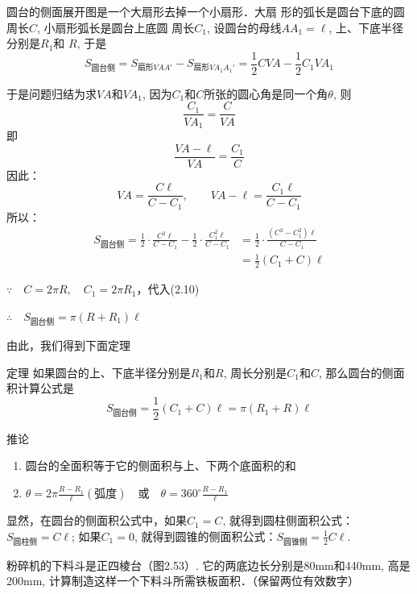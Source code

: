 圆台的侧面展开图是一个大扇形去掉一个小扇形．大扇
形的弧长是圆台下底的圆周长$C$, 小扇形弧长是圆台上底圆
周长$C_1$, 设圆台的母线$AA_1=\ell$, 上、下底半径分别是$R_1$和
$R$, 于是
\[S_{\text{圆台侧}}=S_{\text{扇形}VAA'}-S_{\text{扇形}VA_1A_1'}=\frac{1}{2}CVA-\frac{1}{2}C_1VA_1\]

于是问题归结为求$VA$和$VA_1$, 因为$C_1$和$C$所张的圆心角是同一个角$\theta$, 则
\[\frac{C_1}{VA_1}=\frac{C}{VA}\]
即
\[\frac{VA-\ell}{VA}=\frac{C_1}{C}\]
因此：
\begin{equation}
VA=\frac{C\ell}{C-C_1},\qquad VA-\ell=\frac{C_1\ell}{C-C_1}    
\end{equation}
所以：
\begin{equation}
    \begin{split}
S_{\text{圆台侧}}=\frac{1}{2}\cdot\frac{C^2\ell}{C-C_1}-\frac{1}{2}\cdot \frac{C^2_1\ell}{C-C_1}&=\frac{1}{2}\cdot\frac{(C^2-C^2_1)\ell}{C-C_1}\\
&=\frac{1}{2}(C_1+C)\ell        
    \end{split}
\end{equation}

$\because\quad C=2\pi R,\quad  C_1=2\pi R_1$，代入(2.10)

$\therefore\quad S_{\text{圆台侧}}=\pi(R+R_1)\ell$

由此，我们得到下面定理

\begin{blk}
    {定理} 如果圆台的上、下底半径分别是$R_1$和$R$, 周长分别是$C_1$和$C$, 那么圆台的侧面积计算公式是
\[S_{\text{圆台侧}}=\frac{1}{2}(C_1+C)\ell=\pi(R_1+R)\ell \]
\end{blk}

\begin{blk}{推论}
\begin{enumerate}
    \item 圆台的全面积等于它的侧面积与上、下两个底面积的和
    \item $\theta=2\pi\frac{R-R_1}{\ell}(\text{弧度})\quad \text{或}\quad \theta=360^{\circ}\frac{R-R_1}{\ell}$
\end{enumerate}
显然，在圆台的侧面积公式中，如果$C_1=C$, 就得到圆柱侧面积公式：$S_{\text{圆柱侧}}=C\ell$; 如果$C_1=0$, 就得到圆锥的侧面积公式：$S_{\text{圆锥侧}}=\frac{1}{2}C\ell$.
\end{blk}



\begin{example}
粉碎机的下料斗是正四棱台（图2.53）. 它的两底边长分别是80mm和440mm, 高是200mm, 计算制造这样一个下料斗所需铁板面积．（保留两位有效数字）
\end{example}

